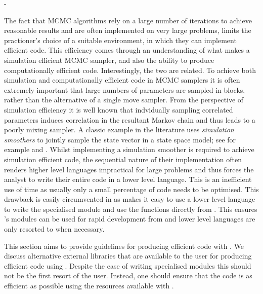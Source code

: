 -\documentclass[article]{jss}
\begin{document}
The fact that MCMC algorithms rely on a large number of iterations to
achieve reasonable results and are often implemented on very large
problems, limits the practioner's choice of a suitable environment, in
which they can implement efficient code. This efficiency comes through
an understanding of what makes a simulation efficient MCMC sampler,
and also the ability to produce computationally efficient code.
Interestingly, the two are related. To achieve both simulation and
computationally efficient code in MCMC samplers it is often extremely
important that large numbers of parameters are sampled in blocks,
rather than the alternative of a single move sampler. From the
perspective of simulation efficiency it is well known that indvidually
sampling correlated parameters induces correlation in the resultant
Markov chain and thus leads to a poorly mixing sampler. A classic
example in the literature uses \emph{simulation smoothers }to jointly
sample the state vector in a state space model; see for example
\citet{CarterKohn1994} and \citet{deJongShepard1995}.  Whilst
implementing a simulation smoother is required to achieve simulation
efficient code, the sequential nature of their implementation often
renders higher level languages impractical for large problems and thus
forces the analyst to write their entire code in a lower level
language. This is an inefficient use of time as usually only a small
percentage of code needs to be optimised. This drawback is easily
circumvented in  as  makes it easy to use
a lower level language to write the specialised module and use the
functions directly from . This ensures 's
modules can be used for rapid development from  and
lower level languages are only resorted to when necessary.

This section aims to provide guidelines for producing efficient code
with . We discuss alternative external libraries that are
available to the user for producing efficient code using .
Despite the ease of writing specialised modules this should not be the
first resort of the user. Instead, one should ensure that the
 code is as efficient as possible using the resources
available with .
\end{document}
